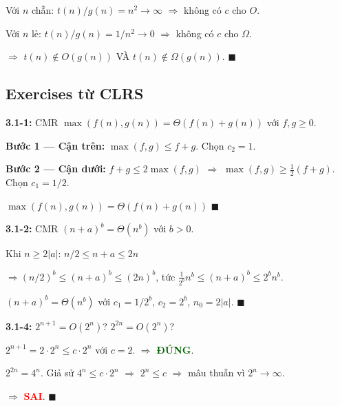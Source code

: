 \documentclass[12pt,a4paper]{article}
\begin{document}
\begin{enumerate}[label=\textbf{\alph*.}]
  Với $n$ chẵn: $t(n)/g(n) = n^2 \to \infty$ $\Rightarrow$ không có $c$ cho $O$.

  Với $n$ lẻ: $t(n)/g(n) = 1/n^2 \to 0$ $\Rightarrow$ không có $c$ cho $\Omega$.

  $\Longrightarrow$ $t(n) \notin O(g(n))$ VÀ $t(n) \notin \Omega(g(n))$. \hfill $\blacksquare$

\end{enumerate}

\subsection{Exercises từ CLRS}

\textbf{3.1-1:} CMR $\max(f(n), g(n)) = \Theta(f(n) + g(n))$ với $f, g \geq 0$.

\textbf{Bước 1 --- Cận trên:} $\max(f,g) \leq f + g$. Chọn $c_2 = 1$. \checkmark

\textbf{Bước 2 --- Cận dưới:} $f + g \leq 2\max(f,g)$ $\Rightarrow$ $\max(f,g) \geq \frac{1}{2}(f+g)$. Chọn $c_1 = 1/2$. \checkmark

\begin{resultbox}
$\max(f(n), g(n)) = \Theta(f(n) + g(n))$ \hfill $\blacksquare$
\end{resultbox}

\bigskip

\textbf{3.1-2:} CMR $(n+a)^b = \Theta(n^b)$ với $b > 0$.

Khi $n \geq 2|a|$: $n/2 \leq n+a \leq 2n$

$\Rightarrow (n/2)^b \leq (n+a)^b \leq (2n)^b$, tức $\frac{1}{2^b} n^b \leq (n+a)^b \leq 2^b n^b$.

\begin{resultbox}
$(n+a)^b = \Theta(n^b)$ với $c_1 = 1/2^b$, $c_2 = 2^b$, $n_0 = 2|a|$. \hfill $\blacksquare$
\end{resultbox}

\bigskip

\textbf{3.1-4:} $2^{n+1} = O(2^n)$? \quad $2^{2n} = O(2^n)$?

$2^{n+1} = 2 \cdot 2^n \leq c \cdot 2^n$ với $c = 2$. $\Longrightarrow$ \textcolor{darkgreen}{\textbf{ĐÚNG}}. \checkmark

$2^{2n} = 4^n$. Giả sử $4^n \leq c \cdot 2^n$ $\Rightarrow$ $2^n \leq c$ $\Rightarrow$ mâu thuẫn vì $2^n \to \infty$.

$\Longrightarrow$ \textcolor{red}{\textbf{SAI}}. \hfill $\blacksquare$

\newpage
\end{document}
